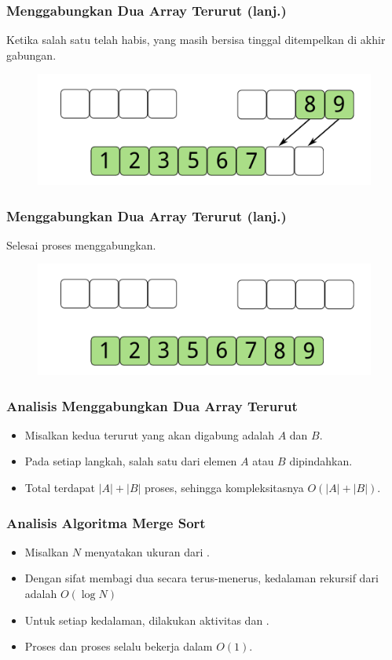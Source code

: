 \begin{frame}
\frametitle{Menggabungkan Dua Array Terurut (lanj.)}
Ketika salah satu \farray telah habis, \farray yang masih bersisa tinggal ditempelkan di akhir \farray gabungan.
\begin{figure}
  \centering
  \includegraphics[width=10 cm]{asset/merge-array-pair-8.pdf}
\end{figure}
\end{frame}

\begin{frame}
\frametitle{Menggabungkan Dua Array Terurut (lanj.)}
Selesai proses menggabungkan.
\begin{figure}
  \centering
  \includegraphics[width=10 cm]{asset/merge-array-pair-9.pdf}
\end{figure}
\end{frame}

\begin{frame}
\frametitle{Analisis Menggabungkan Dua Array Terurut}
\begin{itemize}
  \item Misalkan kedua \farray terurut yang akan digabung adalah $A$ dan $B$.
  \item Pada setiap langkah, salah satu dari elemen $A$ atau $B$ dipindahkan.
  \item Total terdapat $|A| + |B|$ proses, sehingga kompleksitasnya $O(|A| + |B|)$.
\end{itemize}
\end{frame}

\begin{frame}
\frametitle{Analisis Algoritma Merge Sort}
\begin{itemize}
  \item Misalkan $N$ menyatakan ukuran dari \farray.
  \item Dengan sifat membagi dua secara terus-menerus, kedalaman rekursif dari \fmergeSort adalah $O(\log{N})$
  \item Untuk setiap kedalaman, dilakukan aktivitas  dan .
  \item Proses  dan proses  selalu bekerja dalam $O(1)$.
\end{itemize}
\end{frame}

